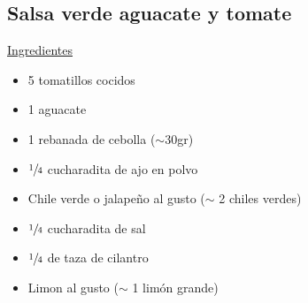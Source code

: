 \subsection{Salsa verde aguacate y tomate}

\underline{Ingredientes}

\begin{itemize}
\item 5 tomatillos cocidos
\item 1 aguacate
\item 1 rebanada de cebolla ($\sim$30gr)
\item $\sfrac{1}{4}$ cucharadita de ajo en polvo
\item Chile verde o jalapeño al gusto ($\sim$ 2 chiles verdes)
\item $\sfrac{1}{4}$ cucharadita de sal
\item $\sfrac{1}{4}$ de taza de cilantro
\item Limon al gusto ($\sim$ 1 lim\'on grande)
\end{itemize}

